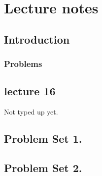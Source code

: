%
%
\part{Lecture notes}
   \chapter{Introduction}
      
   
   
   
   
   
   
   
   
   
   
   
   
   
   
   
   
   \section{Problems}
      
      
   \chapter{lecture 16}
      Not typed up yet.
   

   \chapter{Problem Set 1.}

      
      
      
      
      

   \chapter{Problem Set 2.}

      
      
      
      

